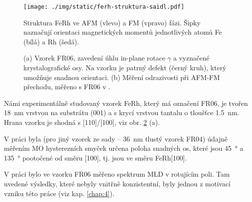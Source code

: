 \begin{figure}[htbp]
    \centering
    \texttt{[image: ./img/static/ferh-struktura-saidl.pdf]}
    \caption{Struktura FeRh ve AFM (vlevo) a FM (vpravo) fázi.
        Šipky naznačují orientaci magnetických momentů jednotlivých atomů Fe (bílá) a Rh (šedá). \cite{saidlInvestigationMagnetostructuralPhase2016}}
    \label{fig:ferh-struktura}
\end{figure}

\begin{figure}[htbp]
    \centering
    
    \caption{(a) Vzorek FR06, zavedení úhlu in-plane rotace $\gamma$ a vyznačené krystalografické osy.
    Na vzorku je patrný defekt (černý kruh), který umožňuje snadnou orientaci. (b) Měření odrazivosti při AFM-FM přechodu, měřeno s FR06 v \cite{kubascikMagnetooptickeStudiumAntiferomagnetickych2019}.}
    \label{fig:vzorek-ferh}
\end{figure}

Námi experimentálně studovaný vzorek FeRh, který má označení FR06, je tvořen \SI{18}{\nano\meter} vrstvou  na substrátu (001) a s krycí vrstvou tantalu o tloušťce \SI{1.5}{\nano\meter}.
Hrana vzorku je shodná s [110]/[100], viz obr. \ref{fig:vzorek-ferh} (a).

V práci \cite{brajerLaserovaSpektroskopieMaterialu2015} byla (pro jiný vzorek ze sady -- \SI{36}{\nano\meter} tlustý vzorek FR04) údajně měřením MO hysterezních smyček určena poloha snadných os, které jsou \SI{45}{\degree} a \SI{135}{\degree} pootočené od směru [100], tj. jsou ve směru FeRh[100].

V práci \cite{kubascikMagnetooptickeStudiumAntiferomagnetickych2019} bylo ve vzorku FR06 měřeno spektrum MLD v rotujícím poli.
Tam uvedené výsledky, které nebyly vnitřně konzistentní, byly jednou z motivací vzniku této práce (viz kap. \ref{chap:4}).

